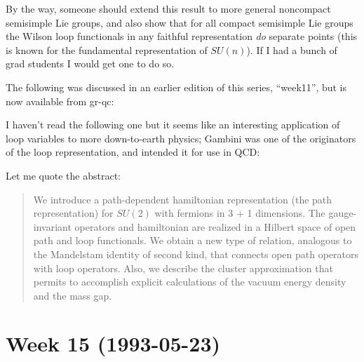 \documentclass{article}
\def\tightlist{}
\renewcommand{\texttt}[1]{%
  \begingroup
  \ttfamily
  \begingroup\lccode`~=`/\lowercase{\endgroup\def~}{/\discretionary{}{}{}}%
  \begingroup\lccode`~=`[\lowercase{\endgroup\def~}{[\discretionary{}{}{}}%
  \begingroup\lccode`~=`.\lowercase{\endgroup\def~}{.\discretionary{}{}{}}%
  \catcode`/=\active\catcode`[=\active\catcode`.=\active
  \scantokens{#1\noexpand}%
  \endgroup
}
\begin{document}
By the way, someone should extend this result to more general noncompact
semisimple Lie groups, and also show that for all compact semisimple Lie
groups the Wilson loop functionals in any faithful representation
\emph{do} separate points (this is known for the fundamental
representation of \(SU(n)\)). If I had a bunch of grad students I would
get one to do so.

The following was discussed in an earlier edition of this series,
``week11'', but is now available from gr-qc:


I haven't read the following one but it seems like an interesting
application of loop variables to more down-to-earth physics; Gambini was
one of the originators of the loop representation, and intended it for
use in QCD:


Let me quote the abstract:

\begin{quote}
We introduce a path-dependent hamiltonian representation (the path
representation) for \(SU(2)\) with fermions in 3 + 1 dimensions. The
gauge-invariant operators and hamiltonian are realized in a Hilbert
space of open path and loop functionals. We obtain a new type of
relation, analogous to the Mandelstam identity of second kind, that
connects open path operators with loop operators. Also, we describe the
cluster approximation that permits to accomplish explicit calculations
of the vacuum energy density and the mass gap.
\end{quote}
\hypertarget{week-15-1993-05-23}{%
\section{Week 15 (1993-05-23)}\label{week-15-1993-05-23}}
\end{document}
